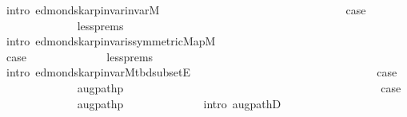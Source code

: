 \begin{isabellebody}
\ {\isacharparenleft}{\kern0pt}intro\ edmonds{\isacharunderscore}{\kern0pt}karp{\isacharunderscore}{\kern0pt}invar{\isachardot}{\kern0pt}invar{\isacharunderscore}{\kern0pt}M{\isacharparenright}{\kern0pt}\isanewline
\ \ \ \ \ \ \ \ \isamarkupfalse%
\isanewline
\ \ \ \ \ \ \ \ \ \ \isamarkupfalse%
\ {}\isanewline
\ \ \ \ \ \ \ \ \ \ \isamarkupfalse%
\ {\isacharquery}{\kern0pt}case\isanewline
\ \ \ \ \ \ \ \ \ \ \ \ \isamarkupfalse%
\ less{\isachardot}{\kern0pt}prems\isanewline
\ \ \ \ \ \ \ \ \ \ \ \ \isamarkupfalse%
\ {\isacharparenleft}{\kern0pt}intro\ edmonds{\isacharunderscore}{\kern0pt}karp{\isacharunderscore}{\kern0pt}invar{\isachardot}{\kern0pt}is{\isacharunderscore}{\kern0pt}symmetric{\isacharunderscore}{\kern0pt}Map{\isacharunderscore}{\kern0pt}M{\isacharparenright}{\kern0pt}\isanewline
\ \ \ \ \ \ \ \ \isamarkupfalse%
\isanewline
\ \ \ \ \ \ \ \ \ \ \isamarkupfalse%
\ {}\isanewline
\ \ \ \ \ \ \ \ \ \ \isamarkupfalse%
\ {\isacharquery}{\kern0pt}case\isanewline
\ \ \ \ \ \ \ \ \ \ \ \ \isamarkupfalse%
\ less{\isachardot}{\kern0pt}prems\isanewline
\ \ \ \ \ \ \ \ \ \ \ \ \isamarkupfalse%
\ {\isacharparenleft}{\kern0pt}intro\ edmonds{\isacharunderscore}{\kern0pt}karp{\isacharunderscore}{\kern0pt}invar{\isachardot}{\kern0pt}M{\isacharunderscore}{\kern0pt}tbd{\isacharunderscore}{\kern0pt}subset{\isacharunderscore}{\kern0pt}E{\isacharparenright}{\kern0pt}\isanewline
\ \ \ \ \ \ \ \ \isamarkupfalse%
\isanewline
\ \ \ \ \ \ \ \ \ \ \isamarkupfalse%
\ {}\isanewline
\ \ \ \ \ \ \ \ \ \ \isamarkupfalse%
\ {\isacharquery}{\kern0pt}case\isanewline
\ \ \ \ \ \ \ \ \ \ \ \ \isamarkupfalse%
\ augpath{\isacharunderscore}{\kern0pt}p\isanewline
\ \ \ \ \ \ \ \ \ \ \ \ \isacommand{{\isachardot}{\kern0pt}}\isamarkupfalse%
\isanewline
\ \ \ \ \ \ \ \ \isamarkupfalse%
\isanewline
\ \ \ \ \ \ \ \ \ \ \isamarkupfalse%
\ {}\isanewline
\ \ \ \ \ \ \ \ \ \ \isamarkupfalse%
\ {\isacharquery}{\kern0pt}case\isanewline
\ \ \ \ \ \ \ \ \ \ \ \ \isamarkupfalse%
\ augpath{\isacharunderscore}{\kern0pt}p\isanewline
\ \ \ \ \ \ \ \ \ \ \ \ \isamarkupfalse%
\ {\isacharparenleft}{\kern0pt}intro\ augpathD{\isacharparenleft}{\kern0pt}{}{\isacharparenright}{\kern0pt}{\isacharparenright}{\kern0pt}\isanewline
\ \ \ \ \ \ \ \ \isamarkupfalse%

\end{isabellebody}
